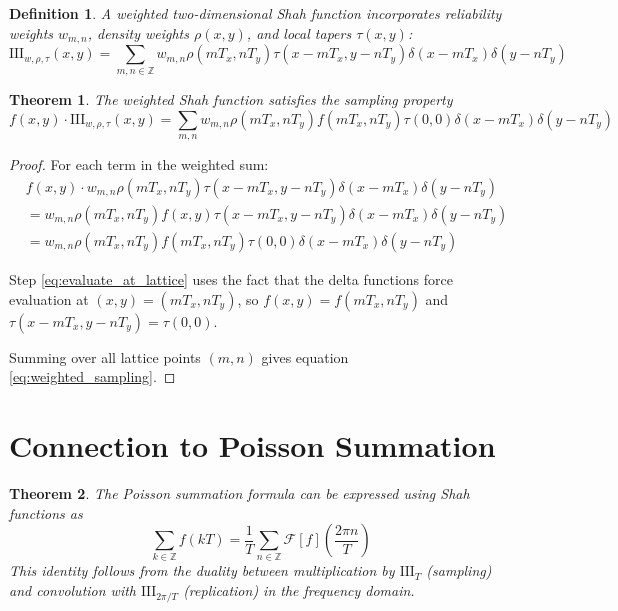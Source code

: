 \documentclass{article}
\newtheorem{theorem}{Theorem}
\newtheorem{definition}{Definition}
\begin{document}
\begin{definition}
\label{def:weighted_shah}
A weighted two-dimensional Shah function incorporates reliability weights $w_{m,n}$, density weights $\rho(x,y)$, and local tapers $\tau(x,y)$:
\begin{equation}
\label{eq:weighted_shah}
\text{III}_{w,\rho,\tau}(x,y) = \sum_{m,n \in \mathbb{Z}} w_{m,n} \rho(mT_x, nT_y) \tau(x - mT_x, y - nT_y) \delta(x - mT_x) \delta(y - nT_y)
\end{equation}
\end{definition}

\begin{theorem}
\label{thm:weighted_shah_properties}
The weighted Shah function satisfies the sampling property
\begin{equation}
\label{eq:weighted_sampling}
f(x,y) \cdot \text{III}_{w,\rho,\tau}(x,y) = \sum_{m,n} w_{m,n} \rho(mT_x, nT_y) f(mT_x, nT_y) \tau(0,0) \delta(x - mT_x) \delta(y - nT_y)
\end{equation}
\end{theorem}

\begin{proof}
For each term in the weighted sum:
\begin{align}
&f(x,y) \cdot w_{m,n} \rho(mT_x, nT_y) \tau(x - mT_x, y - nT_y) \delta(x - mT_x) \delta(y - nT_y) \nonumber\\
&= w_{m,n} \rho(mT_x, nT_y) f(x,y) \tau(x - mT_x, y - nT_y) \delta(x - mT_x) \delta(y - nT_y) \label{eq:rearrange_factors}\\
&= w_{m,n} \rho(mT_x, nT_y) f(mT_x, nT_y) \tau(0, 0) \delta(x - mT_x) \delta(y - nT_y) \label{eq:evaluate_at_lattice}
\end{align}

Step \eqref{eq:evaluate_at_lattice} uses the fact that the delta functions force evaluation at $(x,y) = (mT_x, nT_y)$, so $f(x,y) = f(mT_x, nT_y)$ and $\tau(x - mT_x, y - nT_y) = \tau(0,0)$.

Summing over all lattice points $(m,n)$ gives equation \eqref{eq:weighted_sampling}.
\end{proof}

\section{Connection to Poisson Summation}

\begin{theorem}
\label{thm:poisson_shah_connection}
The Poisson summation formula can be expressed using Shah functions as
\begin{equation}
\label{eq:poisson_shah}
\sum_{k \in \mathbb{Z}} f(kT) = \frac{1}{T} \sum_{n \in \mathbb{Z}} \mathcal{F}[f]\left(\frac{2\pi n}{T}\right)
\end{equation}
This identity follows from the duality between multiplication by $\text{III}_T$ (sampling) and convolution with $\text{III}_{2\pi/T}$ (replication) in the frequency domain.
\end{theorem}
\end{document}
